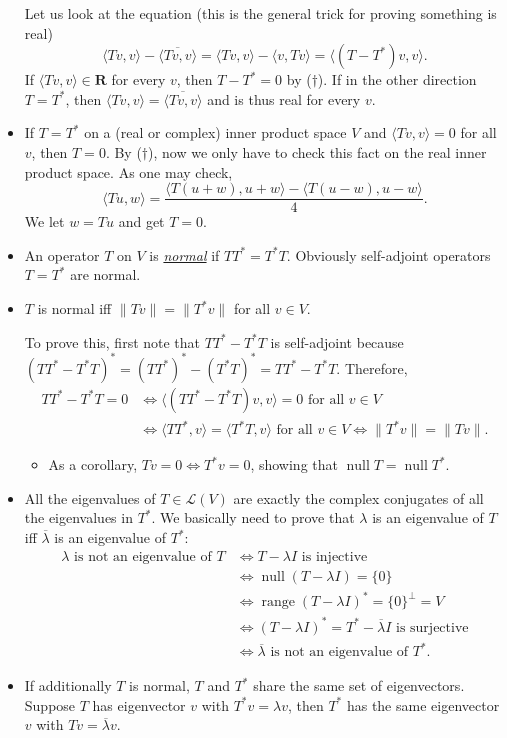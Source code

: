 \documentclass[11pt]{article}
\newcommand{\df}[1]{\ul{\textit{\textsf{#1}}}}
\newcommand{\R}{\mathbf{R}}
\newcommand{\n}{\operatorname{null}}
\renewcommand{\r}{\operatorname{range}}
\newcommand{\conj}[1]{\overline{#1}}
\newcommand{\inp}[2]{\langle #1, #2 \rangle}
\newcommand{\nm}[1]{\|#1\|}
\newcommand{\LV}{\mathcal{L}(V)}
\begin{document}
\begin{itemize}
    Let us look at the equation (this is the general trick for proving something is real)
    $$\inp{Tv}{v}-\conj{\inp{Tv}{v}}=\inp{Tv}{v}-\inp{v}{Tv}=\inp{(T-T^*)v}{v}.$$ If $\inp{Tv}{v} \in \R$ for every $v$, then $T-T^*=0$ by ($\dagger$). If in the other direction $T=T^*$, then $\inp{Tv}{v}=\conj{\inp{Tv}{v}}$ and is thus real for every $v$.
    \item If $T = T^*$ on a (real or complex) inner product space $V$ and $\inp{Tv}{v}=0$ for all $v$, then $T = 0$. By ($\dagger$), now we only have to check this fact on the real inner product space. As one may check, $$\inp{Tu}{w} = \frac{\inp{T(u+w)}{u+w}-\inp{T(u-w)}{u-w}}{4}.$$ We let $w = Tu$ and get $T = 0$.
    \item An operator $T$ on $V$ is \df{normal} if $TT^* = T^*T$. Obviously self-adjoint operators $T = T^*$ are normal.
    \item $T$ is normal iff $\nm{Tv}=\nm{T^*v}$ for all $v \in V$.
    
    To prove this, first note that $TT^* - T^*T$ is self-adjoint because $(TT^*-T^*T)^*=(TT^*)^*-(T^*T)^*=TT^* - T^*T$. Therefore,
    \begin{align*}
        TT^*-T^*T=0 & \iff \inp{(TT^*-T^*T)v}{v}=0 \text{ for all } v \in V \\ & \iff \inp{TT^*}{v} = \inp{T^*T}{v} \text{ for all } v \in V \iff \nm{T^*v}=\nm{Tv}.
    \end{align*}
    \begin{itemize}
        \item As a corollary, $Tv = 0 \iff T^*v = 0$, showing that $\n T = \n T^*$.
    \end{itemize}
    \item All the eigenvalues of $T \in \LV$ are exactly the complex conjugates of all the eigenvalues in $T^*$. We basically need to prove that $\lambda$ is an eigenvalue of $T$ iff $\conj{\lambda}$ is an eigenvalue of $T^*$:
    \begin{align*}
        \lambda \text{ is not an eigenvalue of } T & \iff T - \lambda I \text{ is injective} \\ & \iff \n (T-\lambda I) = \{0\} \\ & \iff \r (T-\lambda I)^* = \{0\}^\perp = V \\ & \iff (T-\lambda I)^* = T^* - \conj{\lambda} I \text{ is surjective} \\ & \iff \conj{\lambda} \text{ is not an eigenvalue of $T^*$}.
    \end{align*}
    \item If additionally $T$ is normal, $T$ and $T^*$ share the same set of eigenvectors. Suppose $T$ has eigenvector $v$ with $T^*v = \lambda v$, then $T^*$ has the same eigenvector $v$ with $Tv = \conj{\lambda}v$.
    

\end{itemize}
\end{document}

